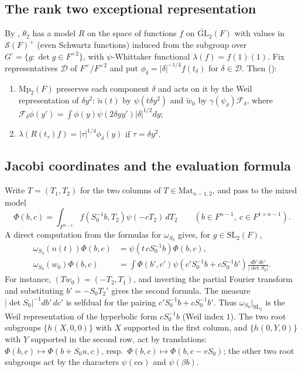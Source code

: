 \documentclass[11pt,oneside,notitlepage]{book}
\numberwithin{equation}{section}
\theoremstyle{plain}
\theoremstyle{definition}
\newcommand{\GL}{\mathrm{GL}}
\newcommand{\SL}{\mathrm{SL}}
\newcommand{\Mp}{\mathrm{Mp}}
\newcommand{\Mat}{\mathrm{Mat}}
\newcommand{\cS}{\mathcal{S}}
\newcommand{\tGL}{\widetilde{\GL}}
\begin{document}
\subsection*{The rank two exceptional representation}
By , $\theta_2$ has a model $R$ on the space of functions $f$ on $\tGL_2(F)$ with values in $\cS(F)^+$ (even Schwartz functions) induced from the subgroup over $G^\square=\{g:\det g\in F^{\times2}\}$, with $\psi$-Whittaker functional $\lambda(f)=f(1)(1)$. Fix representatives $\mathcal D$ of $F^\times/F^{\times2}$ and put $\phi_\delta=|\delta|^{-1/4}f(t_\delta)$ for $\delta\in\mathcal D$. Then ():
\begin{enumerate}[label=(\roman*)]
	\item $\Mp_2(F)$ preserves each component $\delta$ and acts on it by the Weil representation of $\delta y^2$: $\tilde n(t)$ by $\psi(t\delta y^2)$ and $\tilde w_0$ by $\gamma(\psi_\delta)\mathcal F_\delta$, where $\mathcal F_\delta\phi(y')=\int\phi(y)\psi(2\delta yy')|\delta|^{1/2}dy$;
	\item $\lambda(R(t_\tau )f)=|\tau |^{1/4}\phi_\delta(y)$ if $\tau =\delta y^2$.
\end{enumerate}

\subsection*{Jacobi coordinates and the evaluation formula}

Write $T=(T_1,T_2)$ for the two columns of $T\in\Mat_{n-1,2}$, and pass to the mixed model
\[\Phi(b,c)=\int_{F^{n-1}}f(S_0^{-1}b,T_2)\psi(-cT_2)\,dT_2\qquad(b\in F^{n-1},\ c\in F^{1\times n-1}).\]
A direct computation from the formulas for $\omega_{S_0}$ gives, for $g\in\SL_2(F)$,
\begin{equation}\label{eq:mixed}
	\begin{aligned}
		\omega_{S_0}(n(t))\Phi(b,c)
		&=\psi(t\,cS_0^{-1}b)\Phi(b,c),\\
		\omega_{S_0}(w_0)\Phi(b,c)
		&=\int\Phi(b',c')\psi(c'S_0^{-1}b+cS_0^{-1}b')
		\frac{db'\,dc'}{|\det S_0|}.
	\end{aligned}
\end{equation}
For instance, $(Tw_0)=(-T_2,T_1)$, and inverting the partial Fourier transform and substituting $b'=-S_0T_2'$ gives the second formula. The measure $|\det S_0|^{-1}db'\,dc'$ is selfdual for the pairing $c'S_0^{-1}b+cS_0^{-1}b'$. Thus $\omega_{S_0}|_{\SL_2}$ is the Weil representation of the hyperbolic form $cS_0^{-1}b$ (Weil index $1$). The two root subgroups $\{h(X,0,0)\}$ with $X$ supported in the first column, and $\{h(0,Y,0)\}$ with $Y$ supported in the second row, act by translations: $\Phi(b,c)\mapsto\Phi(b+S_0u,c)$, resp.\ $\Phi(b,c)\mapsto\Phi(b,c-vS_0)$; the other two root subgroups act by the characters $\psi(c\alpha)$ and $\psi(\beta b)$.
\end{document}
